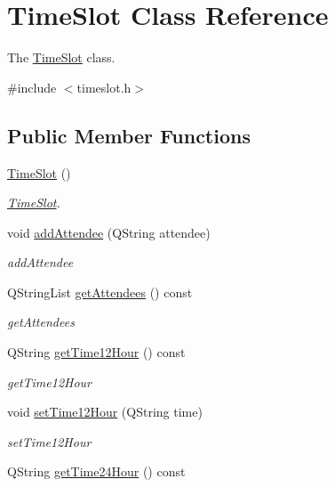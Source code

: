\hypertarget{class_time_slot}{}\section{Time\+Slot Class Reference}
\label{class_time_slot}


The \hyperlink{class_time_slot}{Time\+Slot} class.  




{\ttfamily \#include $<$timeslot.\+h$>$}

\subsection*{Public Member Functions}
\begin{DoxyCompactItemize}
\item 
\hyperlink{class_time_slot_a8bdfc0039c8da76edc16c4a1070bdc80}{Time\+Slot} ()
\begin{DoxyCompactList}\small\item\em \hyperlink{class_time_slot}{Time\+Slot}. \end{DoxyCompactList}\item 
void \hyperlink{class_time_slot_a7b0ee031f73b9f6eb40fee11939b9a7e}{add\+Attendee} (Q\+String attendee)
\begin{DoxyCompactList}\small\item\em add\+Attendee \end{DoxyCompactList}\item 
Q\+String\+List \hyperlink{class_time_slot_a01c092d21d983b5b67cf2678f54d2c74}{get\+Attendees} () const
\begin{DoxyCompactList}\small\item\em get\+Attendees \end{DoxyCompactList}\item 
Q\+String \hyperlink{class_time_slot_a23c04da070ed921bf66396da1d958547}{get\+Time12\+Hour} () const
\begin{DoxyCompactList}\small\item\em get\+Time12\+Hour \end{DoxyCompactList}\item 
void \hyperlink{class_time_slot_a9b50d81d78b54b9127029e7fffba198b}{set\+Time12\+Hour} (Q\+String time)
\begin{DoxyCompactList}\small\item\em set\+Time12\+Hour \end{DoxyCompactList}\item 
Q\+String \hyperlink{class_time_slot_aec0c82baaf408509d976307fa682e6ce}{get\+Time24\+Hour} () const

\end{DoxyCompactItemize}
